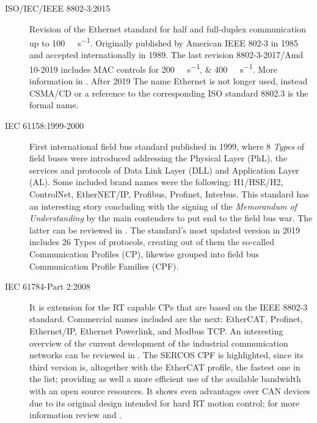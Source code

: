\begin{description}
    \item[ISO/IEC/IEEE 8802-3:2015] Revision of the Ethernet standard for half and full-duplex communication up to \SI{100}{\mega\bit\per\second}. 
    Originally published by American IEEE 802-3 in 1985 and accepted internationally in 1989. The last revision 8802-3-2017/Amd 10-2019 includes
        MAC controls for \SIlist{200;400}{\giga\bit\per\second}. More information in \cite{iso8802_ethernet}. %
        After 2019 The name Ethernet is not longer used, instead CSMA/CD or a reference to the corresponding ISO standard 8802.3 is the formal name.
    \item[IEC 61158:1999-2000] First international field bus standard published in 1999, where 8 \emph{Types} of field buses were introduced addressing the 
        Physical Layer (PhL), the services and protocols of Data Link Layer (DLL) and Application Layer (AL). Some included brand 
        names were the following: H1/HSE/H2, ControlNet, EtherNET/IP, Profibus, Profinet, Interbus. This standard has an interesting story
        concluding with the signing of the \emph{Memorandum of Understanding} by the main contenders to put end to the field bus war. The latter can be reviewed in \cite{fieldbus_history}.%
         The standard's most updated version in 2019 includes 26 Types of protocols, creating out of them the so-called Communication Profiles (CP), likewise grouped
        into field bus Communication Profile Families (CPF). 
    \item[IEC 61784-Part 2:2008] It is extension for the RT capable CPs that are based on the IEEE 8802-3 standard. Commercial names included 
        are the next: EtherCAT, Profinet, Ethernet/IP, Ethernet Powerlink, and Modbus TCP. An interesting overview of the current development 
        of the industrial communication networks can be reviewed in \cite{future_iiot}. %
        The SERCOS CPF is highlighted, since its third version is, altogether with the EtherCAT profile, the fastest one in the list; providing as well
        a more efficient use of the available bandwidth with an open source resources. It shows even advantages over CAN devices due
        to its original design intended for hard RT motion control; for more information review \cite{sercos_origin} and \cite{sercos_performance}. %

\end{description}

